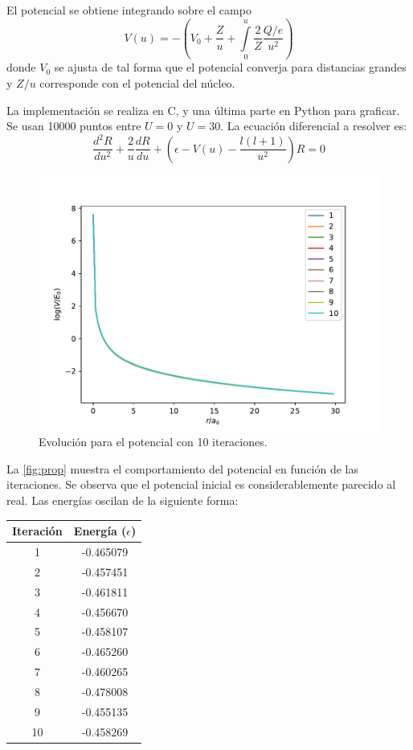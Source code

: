 \documentclass[paper=letter, fontsize=11pt]{scrartcl}
\begin{document}
El potencial se obtiene integrando sobre el campo
\begin{equation}
	V(u) = -\left(V_0 + \dfrac{Z}{u} +  \int\limits_{0}^{u}\dfrac{2}{Z}\dfrac{Q/e}{u^2}\right)
\end{equation}
donde $V_0$ se ajusta de tal forma que el potencial converja para distancias grandes y $Z/u$ corresponde con el potencial del n\'ucleo.

La implementaci\'on se realiza en C, y una \'ultima parte en Python para graficar. Se usan 10000 puntos entre $U=0$ y $U=30$. La ecuaci\'on diferencial a resolver es:
\begin{equation}
	\dfrac{d^2R}{du^2} + \dfrac{2}{u}\dfrac{dR}{du} + \left(\epsilon -V(u) - \dfrac{l(l+1)}{u^2}\right)R = 0
\end{equation}


\begin{figure}[!ht]
	\centering
	\includegraphics[width=0.8\linewidth]{change.pdf}
	\caption{Evoluci\'on para el potencial con 10 iteraciones.}
	\label{fig:prop}
\end{figure}

La \autoref{fig:prop} muestra el comportamiento del potencial en funci\'on de las iteraciones. Se observa que el potencial inicial es considerablemente parecido al real. Las energ\'ias oscilan de la siguiente forma:
\begin{table}[h]
	\centering
	\begin{tabular}{cc}
		\hline
		\textbf{Iteraci\'on} & \textbf{Energ\'ia} ($\epsilon$) \\
		\hline
		1 & -0.465079 \\
		2 & -0.457451 \\
		3 & -0.461811 \\
		4 & -0.456670 \\
		5 & -0.458107 \\
		6 & -0.465260 \\
		7 & -0.460265 \\
		8 & -0.478008 \\
		9 & -0.455135 \\
		10 & -0.458269 \\
		\hline
	\end{tabular}
\end{table}
\end{document}
